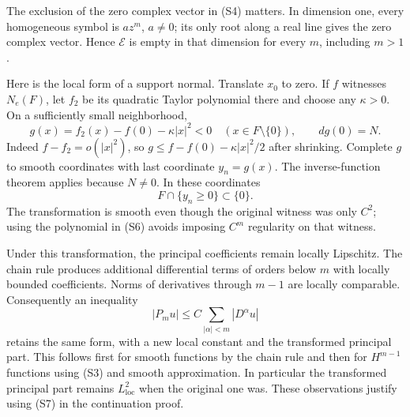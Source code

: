 \documentclass[
  11pt,
]{article}
\makeatletter
\let\ReaderOriginalAnchorStart\hyper@anchorstart
\let\ReaderOriginalAnchorEnd\hyper@anchorend
\let\ReaderPendingAliases\@empty
\def\ReaderArmAliases#1{\gdef\ReaderPendingAliases{#1}}
\def\hyper@anchorstart#1{\ReaderIfNativeAnchorTF{#1}{\ReaderPendingAliases\global\let\ReaderPendingAliases\@empty}{}\ReaderOriginalAnchorStart{#1}}
\makeatother
\begin{document}
The exclusion of the zero complex vector in (S4) matters. In dimension
one, every homogeneous symbol is \(az^m\), \(a\ne0\); its only root
along a real line gives the zero complex vector. Hence \(\mathcal E\) is
empty in that dimension for every \(m\), including \(m>1\).

Here is the local form of a support normal. Translate \(x_0\) to zero.
If \(f\) witnesses \(N_e(F)\), let \(f_2\) be its quadratic Taylor
polynomial there and choose any \(\kappa>0\). On a sufficiently small
neighborhood, \[
 g(x)=f_2(x)-f(0)-\kappa|x|^2<0\quad(x\in F\setminus\{0\}),\qquad
 dg(0)=N.                                                        \tag{S6}
\] Indeed \(f-f_2=o(|x|^2)\), so \(g\leq f-f(0)-\kappa|x|^2/2\) after
shrinking. Complete \(g\) to smooth coordinates with last coordinate
\(y_n=g(x)\). The inverse-function theorem applies because \(N\ne0\). In
these coordinates \[
 F\cap\{y_n\geq0\}\subset\{0\}.                                   \tag{S7}
\] The transformation is smooth even though the original witness was
only \(C^2\); using the polynomial in (S6) avoids imposing \(C^m\)
regularity on that witness.

Under this transformation, the principal coefficients remain locally
Lipschitz. The chain rule produces additional differential terms of
orders below \(m\) with locally bounded coefficients. Norms of
derivatives through \(m-1\) are locally comparable. Consequently an
inequality \[
 |P_mu|\leq C\sum_{|\alpha|<m}|D^\alpha u|                          \tag{S8}
\] retains the same form, with a new local constant and the transformed
principal part. This follows first for smooth functions by the chain
rule and then for \(H^{m-1}\) functions using (S3) and smooth
approximation. In particular the transformed principal part remains
\(L^2_{\mathrm{loc}}\) when the original one was. These observations
justify using (S7) in the continuation proof.

\ReaderArmAliases{\ReaderOriginalAnchorStart{AN03-SUC-002}\ReaderOriginalAnchorEnd\begingroup\expandafter\def\csname @currentHref\endcsname{AN03-SUC-002}\label{AN03-SUC-002}\endgroup\ReaderOriginalAnchorStart{an03-suc-002-a-frequency-inequality-with-one-normal-derivative}\ReaderOriginalAnchorEnd\begingroup\expandafter\def\csname @currentHref\endcsname{an03-suc-002-a-frequency-inequality-with-one-normal-derivative}\label{an03-suc-002-a-frequency-inequality-with-one-normal-derivative}\endgroup\ReaderOriginalAnchorStart{2-a-frequency-inequality-with-one-normal-derivative}\ReaderOriginalAnchorEnd\begingroup\expandafter\def\csname @currentHref\endcsname{2-a-frequency-inequality-with-one-normal-derivative}\label{2-a-frequency-inequality-with-one-normal-derivative}\endgroup\ReaderOriginalAnchorStart{a-frequency-inequality-with-one-normal-derivative}\ReaderOriginalAnchorEnd}
\end{document}
